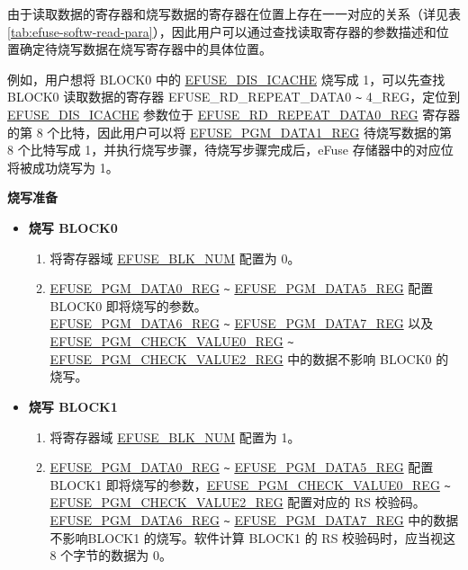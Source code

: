 \documentclass[main\_\_CN.tex]{subfiles}
\begin{document}
由于读取数据的寄存器和烧写数据的寄存器在位置上存在一一对应的关系（详见表 \ref{tab:efuse-softw-read-para}），因此用户可以通过查找读取寄存器的参数描述和位置确定待烧写数据在烧写寄存器中的具体位置。

例如，用户想将 BLOCK0 中的 \hyperref[fielddesc:EFUSEDISICACHE]{EFUSE\_DIS\_ICACHE} 烧写成 1，可以先查找 BLOCK0 读取数据的寄存器 EFUSE\_RD\_REPEAT\_DATA0 \verb+~+ 4\_REG，定位到 \hyperref[fielddesc:EFUSEDISICACHE]{EFUSE\_DIS\_ICACHE} 参数位于 \hyperref[regdesc:EFUSERDREPEATDATA0REG]{EFUSE\_RD\_REPEAT\_DATA0\_REG} 寄存器的第 8 个比特，因此用户可以将 \hyperref[regdesc:EFUSEPGMDATANREG]{EFUSE\_PGM\_DATA1\_REG} 待烧写数据的第 8 个比特写成 1，并执行烧写步骤，待烧写步骤完成后，eFuse 存储器中的对应位将被成功烧写为 1。

{\bfseries 烧写准备}

\begin{itemize}
    \item {\bfseries 烧写 BLOCK0}
    \begin{enumerate}
        \item 将寄存器域 \hyperref[fielddesc:EFUSEBLKNUM]{EFUSE\_BLK\_NUM} 配置为 0。
        \item \hyperref[regdesc:EFUSEPGMDATANREG]{EFUSE\_PGM\_DATA0\_REG} \verb+~+ \hyperref[regdesc:EFUSEPGMDATANREG]{EFUSE\_PGM\_DATA5\_REG} 配置 BLOCK0 即将烧写的参数。\\
        \hyperref[regdesc:EFUSEPGMDATANREG]{EFUSE\_PGM\_DATA6\_REG} \verb+~+ \hyperref[regdesc:EFUSEPGMDATANREG]{EFUSE\_PGM\_DATA7\_REG} 以及\\ \hyperref[regdesc:EFUSEPGMCHECKVALUENREG]{EFUSE\_PGM\_CHECK\_VALUE0\_REG} \verb+~+ \hyperref[regdesc:EFUSEPGMCHECKVALUENREG]{EFUSE\_PGM\_CHECK\_VALUE2\_REG} 中的数据不影响 BLOCK0 的烧写。
    \end{enumerate}
    \item {\bfseries 烧写 BLOCK1}
    \begin{enumerate}
        \item 将寄存器域 \hyperref[fielddesc:EFUSEBLKNUM]{EFUSE\_BLK\_NUM} 配置为 1。
        \item \hyperref[regdesc:EFUSEPGMDATANREG]{EFUSE\_PGM\_DATA0\_REG} \verb+~+ \hyperref[regdesc:EFUSEPGMDATANREG]{EFUSE\_PGM\_DATA5\_REG} 配置 BLOCK1 即将烧写的参数，\hyperref[regdesc:EFUSEPGMCHECKVALUENREG]{EFUSE\_PGM\_CHECK\_VALUE0\_REG} \verb+~+ \hyperref[regdesc:EFUSEPGMCHECKVALUENREG]{EFUSE\_PGM\_CHECK\_VALUE2\_REG} 配置对应的 RS 校验码。\\
        \hyperref[regdesc:EFUSEPGMDATANREG]{EFUSE\_PGM\_DATA6\_REG} \verb+~+ \hyperref[regdesc:EFUSEPGMDATANREG]{EFUSE\_PGM\_DATA7\_REG} 中的数据不影响BLOCK1 的烧写。软件计算 BLOCK1 的 RS 校验码时，应当视这 8 个字节的数据为 0。

\end{enumerate}
\end{itemize}
\end{document}
